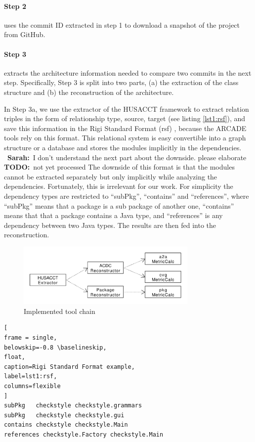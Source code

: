 \documentclass[sigplan, anonymous, review]{acmart}
\newcommand{\sn}[1]{{\color{blue}\textbf{Sarah:}~#1}}
\newcommand{\todo}[1]{{ \color{red} \textbf{TODO:}~#1}}
\begin{document}
\paragraph{Step 2} uses the commit ID extracted in step 1 to download a snapshot of the project from GitHub.


\paragraph{Step 3} extracts the architecture information needed to compare two commits in the next step. 
Specifically, Step 3 is split into two parts, (a) the extraction of the class structure and (b) the reconstruction of the architecture. 

In Step 3a, we use the extractor of the HUSACCT framework \cite{Husacct1} to extract relation triples in the form of relationship type, source, target (see listing \ref{lst1:rsf}), and save this information in the Rigi Standard Format (rsf) \cite{RSF}, because the ARCADE tools rely on this format. This relational system is easy convertible into a graph structure or a database and stores the modules implicitly in the dependencies. 
~\sn{I don't understand the next part about the downside. please elaborate} \todo{not yet processed} The downside of this format is that the modules cannot be extracted separately but only implicitly while analyzing the dependencies. Fortunately, this is irrelevant for our work. For simplicity the dependency types are restricted to ``subPkg'', ``contains'' and ``references'', where ``subPkg'' means that a package is a sub package of another one, ``contains'' means that that a package contains a Java type, and ``references'' is any dependency between two Java types. The results are then fed into the reconstruction.

\begin{figure}[!t]
	\centering
	\includegraphics[width=3.45in]{assets/implementedArc.pdf}
	\caption{Implemented tool chain}
	\label{implToolchain}
\end{figure}

\begin{lstlisting}[
frame = single, 
belowskip=-0.8 \baselineskip,
float,
caption=Rigi Standard Format example,
label=lst1:rsf,
columns=flexible
]
subPkg   checkstyle checkstyle.grammars
subPkg   checkstyle checkstyle.gui
contains checkstyle checkstyle.Main
references checkstyle.Factory checkstyle.Main
\end{lstlisting}
\end{document}
